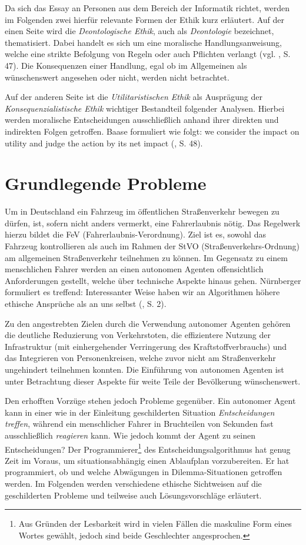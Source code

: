 \documentclass[a4paper, 12pt, titlepage]{scrartcl}
\begin{document}
	Da sich das Essay an Personen aus dem Bereich der Informatik richtet, werden im Folgenden zwei hierf\"ur relevante Formen der Ethik kurz erl\"autert.
	Auf der einen Seite wird die \emph{Deontologische Ethik}, auch als \emph{Deontologie} bezeichnet, thematisiert. Dabei handelt es sich um eine moralische Handlungsanweisung, welche eine strikte Befolgung von Regeln oder auch Pflichten verlangt (vgl. \autocite{baase:fire}, S. 47). Die Konsequenzen einer Handlung, egal ob im Allgemeinen als w\"unschenswert angesehen oder nicht, werden nicht betrachtet. 
	
	Auf der anderen Seite ist die \emph{Utilitaristischen Ethik} als Auspr\"agung der \emph{Konsequenzialistische Ethik} wichtiger Bestandteil folgender Analysen. Hierbei werden moralische Entscheidungen ausschlie\ss lich anhand ihrer direkten und indirekten Folgen getroffen. Baase \autocite{baase:fire} formuliert wie folgt: \glqq we consider the impact on utility and judge the action by its net impact\grqq{} (\autocite{baase:fire}, S. 48).
\section{Grundlegende Probleme}
	Um in Deutschland ein Fahrzeug im \"offentlichen Stra\ss enverkehr bewegen zu d\"urfen, ist, sofern nicht anders vermerkt, eine Fahrerlaubnis n\"otig. Das Regelwerk hierzu bildet die FeV (Fahrerlaubnis-Verordnung). Ziel ist es, sowohl das Fahrzeug kontrollieren als auch im Rahmen der StVO (Stra\ss enverkehrs-Ordnung) am allgemeinen Stra\ss enverkehr teilnehmen zu k\"onnen. Im Gegensatz zu einem menschlichen Fahrer werden an einen autonomen Agenten offensichtlich Anforderungen gestellt, welche \"uber technische Aspekte hinaus gehen. N\"urnberger formuliert es treffend: \glqq Interessanter Weise haben wir an Algorithmen höhere ethische Ansprüche als an uns selbst\grqq{} (\cite{nunu2016}, S. 2).

	Zu den angestrebten Zielen durch die Verwendung autonomer Agenten geh\"oren die deutliche Reduzierung von Verkehrstoten, die effizientere Nutzung der Infrastruktur (mit einhergehender Verringerung des Kraftstoffverbrauchs) und das Integrieren von Personenkreisen, welche zuvor nicht am Stra\ss enverkehr ungehindert teilnehmen konnten. Die Einf\"uhrung von autonomen Agenten ist unter Betrachtung dieser Aspekte f\"ur weite Teile der Bev\"olkerung w\"unschenswert.
	
	Den erhofften Vorz\"uge stehen jedoch Probleme gegen\"uber. Ein autonomer Agent kann in einer wie in der Einleitung geschilderten Situation \emph{Entscheidungen treffen}, w\"ahrend ein menschlicher Fahrer in Bruchteilen von Sekunden fast ausschlie\ss lich \emph{reagieren} kann. Wie jedoch kommt der Agent zu seinen Entscheidungen? Der Programmierer\footnote{Aus Gr\"unden der Lesbarkeit wird in vielen F\"allen die maskuline Form eines Wortes gew\"ahlt, jedoch sind beide Geschlechter angesprochen.} des Entscheidungsalgorithmus hat genug Zeit im Voraus, um situationsabh\"angig einen Ablaufplan vorzubereiten. Er hat programmiert, ob und welche Abw\"agungen in Dilemma-Situationen getroffen werden. Im Folgenden werden verschiedene ethische Sichtweisen auf die geschilderten Probleme und teilweise auch L\"osungsvorschl\"age erl\"autert.   
\end{document}
